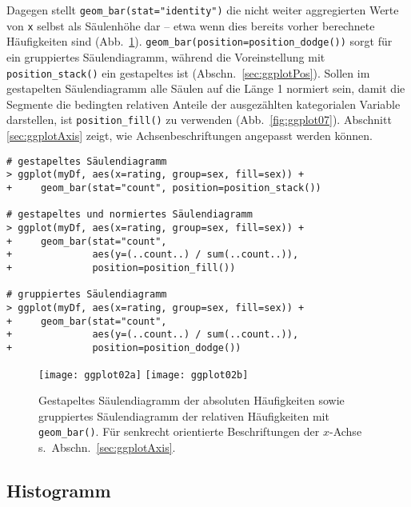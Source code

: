 Dagegen stellt \lstinline!geom_bar(stat="identity")! die nicht weiter aggregierten Werte von \lstinline!x! selbst als Säulenhöhe dar -- etwa wenn dies bereits vorher berechnete Häufigkeiten sind (Abb.\ \ref{fig:ggplot02}). \lstinline!geom_bar(position=position_dodge())! sorgt für ein gruppiertes Säulendiagramm, während die Voreinstellung mit \lstinline!position_stack()! ein gestapeltes ist (Abschn.\ \ref{sec:ggplotPos}). Sollen im gestapelten Säulendiagramm alle Säulen auf die Länge 1 normiert sein, damit die Segmente die bedingten relativen Anteile der ausgezählten kategorialen Variable darstellen, ist \lstinline!position_fill()! zu verwenden (Abb.\ \ref{fig:ggplot07}). Abschnitt \ref{sec:ggplotAxis} zeigt, wie Achsenbeschriftungen angepasst werden können.
\begin{lstlisting}
# gestapeltes Säulendiagramm
> ggplot(myDf, aes(x=rating, group=sex, fill=sex)) +
+     geom_bar(stat="count", position=position_stack())

# gestapeltes und normiertes Säulendiagramm
> ggplot(myDf, aes(x=rating, group=sex, fill=sex)) +
+     geom_bar(stat="count",
+              aes(y=(..count..) / sum(..count..)),
+              position=position_fill())

# gruppiertes Säulendiagramm
> ggplot(myDf, aes(x=rating, group=sex, fill=sex)) +
+     geom_bar(stat="count",
+              aes(y=(..count..) / sum(..count..)),
+              position=position_dodge())
\end{lstlisting}

\begin{figure}[ht]
\centering
\texttt{[image: ggplot02a]}
\texttt{[image: ggplot02b]}
\vspace*{-0.5em}
\caption{Gestapeltes Säulendiagramm der absoluten Häufigkeiten sowie gruppiertes Säulendiagramm der relativen Häufigkeiten mit \lstinline!geom_bar()!. Für senkrecht orientierte Beschriftungen der $x$-Achse s.\ Abschn.\ \ref{sec:ggplotAxis}.}
\label{fig:ggplot02}
\end{figure}

\subsection{Histogramm}

